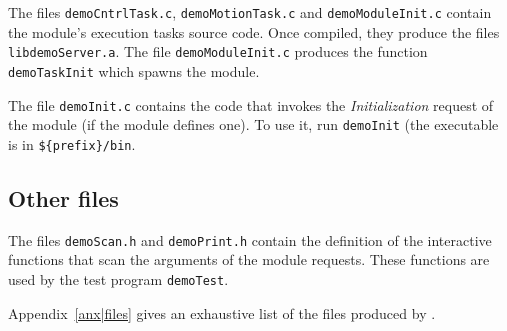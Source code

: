 The  files    \texttt{demoCntrlTask.c},   \texttt{demoMotionTask.c}    and 
\texttt{demoModuleInit.c} contain the module's execution tasks source code.  Once
compiled, they produce the  files  
\texttt{libdemoServer.a}.  The   file  \texttt{demoModuleInit.c} produces    the
function \texttt{demoTaskInit} which spawns the module.

The file \texttt{demoInit.c} contains the code that invokes the {\em
Initialization} request of the module (if the module defines one). To use
it, run \texttt{demoInit} (the executable is in 
\texttt{\$\{prefix\}/bin}.


\subsection{Other files}

The  files \texttt{demoScan.h} and \texttt{demoPrint.h} contain the definition
of  the interactive   functions  that scan  the  arguments  of the module
requests. These functions are used by the test program \texttt{demoTest}.

Appendix~\ref{anx|files} gives an exhaustive list  of the files  produced
by \GenoM.
